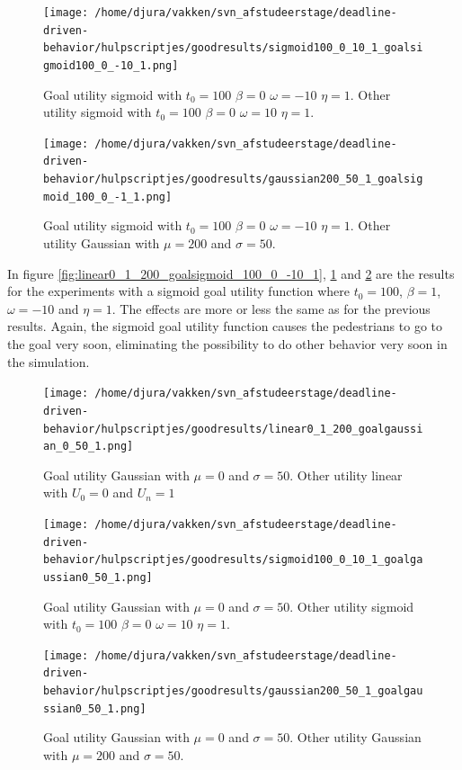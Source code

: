 \documentclass[11pt, a4paper]{book}
\begin{document}
\begin{figure}[h!]
\centering
\texttt{[image: /home/djura/vakken/svn\_afstudeerstage/deadline-driven-behavior/hulpscriptjes/goodresults/sigmoid100\_0\_10\_1\_goalsigmoid100\_0\_-10\_1.png]}
\caption{Goal utility sigmoid with $t_0=100$ $\beta=0$ $\omega=-10$ $\eta=1$. Other utility sigmoid with $t_0=100$ $\beta=0$ $\omega=10$ $\eta=1$.}
\label{fig:sigmoid100_0_10_1_goalsigmoid100_0_-10_1}
\end{figure}

\begin{figure}[h!]
\centering
\texttt{[image: /home/djura/vakken/svn\_afstudeerstage/deadline-driven-behavior/hulpscriptjes/goodresults/gaussian200\_50\_1\_goalsigmoid\_100\_0\_-1\_1.png]}
\caption{Goal utility sigmoid with $t_0=100$ $\beta=0$ $\omega=-10$ $\eta=1$. Other utility Gaussian with $\mu=200$ and $\sigma=50$.}
\label{fig:gaussian200_50_1_goalsigmoid_100_0_-10_1}
\end{figure}

In figure \ref{fig:linear0_1_200_goalsigmoid_100_0_-10_1}, \ref{fig:sigmoid100_0_10_1_goalsigmoid100_0_-10_1} and \ref{fig:gaussian200_50_1_goalsigmoid_100_0_-10_1} are the results for the experiments with a sigmoid goal utility function where $t_0=100$, $\beta=1$, $\omega=-10$ and $\eta=1$. The effects are more or less the same as for the previous results. Again, the sigmoid goal utility function causes the pedestrians to go to the goal very soon, eliminating the possibility to do other behavior very soon in the simulation.
\begin{figure}[h!]
\centering
\texttt{[image: /home/djura/vakken/svn\_afstudeerstage/deadline-driven-behavior/hulpscriptjes/goodresults/linear0\_1\_200\_goalgaussian\_0\_50\_1.png]}
\caption{Goal utility Gaussian with $\mu=0$ and $\sigma=50$. Other utility linear with $U_0=0$ and $U_n=1$}
\label{fig:linear0_1_200_goalgaussian_0_50_1}
\end{figure}

\begin{figure}[h!]
\centering
\texttt{[image: /home/djura/vakken/svn\_afstudeerstage/deadline-driven-behavior/hulpscriptjes/goodresults/sigmoid100\_0\_10\_1\_goalgaussian0\_50\_1.png]}
\caption{Goal utility Gaussian with $\mu=0$ and $\sigma=50$. Other utility sigmoid with $t_0=100$ $\beta=0$ $\omega=10$ $\eta=1$.}
\label{fig:sigmoid100_0_10_1_goalgaussian0_50_1}
\end{figure}

\begin{figure}[h!]
\centering
\texttt{[image: /home/djura/vakken/svn\_afstudeerstage/deadline-driven-behavior/hulpscriptjes/goodresults/gaussian200\_50\_1\_goalgaussian0\_50\_1.png]}
\caption{Goal utility Gaussian with $\mu=0$ and $\sigma=50$. Other utility Gaussian with $\mu=200$ and $\sigma=50$.}
\label{fig:gaussian200_50_1_goalgaussian0_50_1}
\end{figure}
\end{document}
